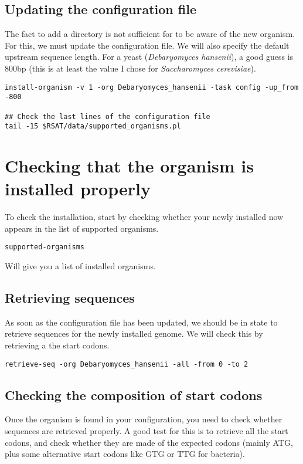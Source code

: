 \subsection{Updating the configuration file}

The fact to add a directory is not sufficient for \RSAT to be aware of
the new organism. For this, we must update the configuration file. We
will also specify the default upstream sequence length. For a yeast
(\textit{Debaryomyces hansenii}), a good guess is 800bp (this is at
least the value I chose for \textit{Saccharomyces cerevisiae}).

\begin{verbatim}
install-organism -v 1 -org Debaryomyces_hansenii -task config -up_from -800

## Check the last lines of the configuration file
tail -15 $RSAT/data/supported_organisms.pl
\end{verbatim}

\section{Checking that the organism is installed properly}

To check the installation, start by checking whether your newly
installed now appears in the list of supported organisms.

\begin{verbatim}
supported-organisms
\end{verbatim}

Will give you a list of installed organisms.


\subsection{Retrieving sequences}

As soon as the configuration file has been updated, we should be in
state to retrieve sequences for the newly installed genome. We will
check this by retrieving a the start codons.

\begin{verbatim}
retrieve-seq -org Debaryomyces_hansenii -all -from 0 -to 2
\end{verbatim}

\subsection{Checking the composition of start codons}

Once the organism is found in your configuration, you need to check
whether sequences are retrieved properly. A good test for this is to
retrieve all the start codons, and check whether they are made of the
expected codons (mainly ATG, plus some alternative start codons like
GTG or TTG for bacteria).

